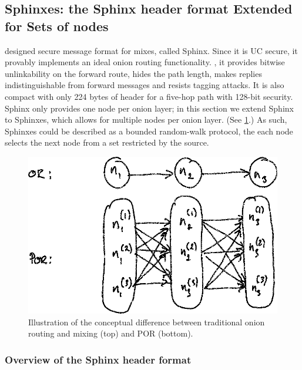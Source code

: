 
\subsection{Sphinxes: the Sphinx header format Extended for Sets of nodes}%
\label{Sphinxes}

\Textcite{Sphinx} designed  secure message format for mixes, called 
Sphinx.
Since it is \ac{UC} secure, it provably implements an ideal onion routing 
functionality.
\Ie, it provides bitwise unlinkability on the forward route, hides the path 
length, makes replies indistinguishable from forward messages and resists 
tagging attacks.
It is also compact with only 224 bytes of header for a five-hop path with 
128-bit security.
Sphinx only provides one node per onion layer; in this section we extend Sphinx 
to Sphinxes, which allows for multiple nodes per onion layer.
(See \cref{fig:OR-POR}.)
As such, Sphinxes could be described as a bounded random-walk protocol, \ie the 
each node selects the next node from a set restricted by the source.

\begin{figure}
  \includegraphics[width=\linewidth]{figures/OR-POR.png}
  \caption{\label{fig:OR-POR}%
    Illustration of the conceptual difference between traditional onion routing 
    and mixing (top) and \ac{POR} (bottom).
  }
\end{figure}

\subsubsection{Overview of the Sphinx header format}

